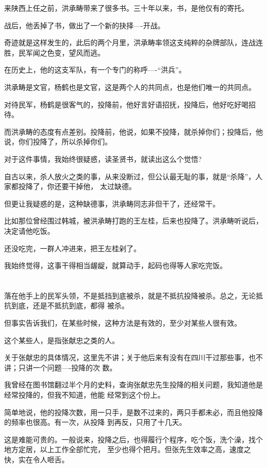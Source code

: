 \documentclass[11pt,a4paper,onecolumn]{article}
\begin{document}
来陕西上任之前，洪承畴带来了很多书。三十年以来，书，是他仅有的寄托。

战后，他丢掉了书，做出了一个新的抉择----开战。

奇迹就是这样发生的，此后的两个月里，洪承畴率领这支纯粹的杂牌部队，连战连胜，民军闻之色变，望风而逃。

在历史上，他的这支军队，有一个专门的称呼----``洪兵''。

洪承畴是文官，杨鹤也是文官，这是两个人的共同点，也是他们唯一的共同点。

对待民军，杨鹤是很客气的，投降前，他好言好语招抚，投降后，他好吃好喝招待。

而洪承畴的态度有点差别。投降前，他说，如果不投降，就杀掉你们；投降后，他说，你们投降了，所以杀掉你们。

对于这件事情，我始终很疑惑，读圣贤书，就读出这么个觉悟?

自古以来，杀人放火之类的事，从来没断过，但公认最无耻的事，就是``杀降''，人家都投降了，你还要干掉他，
太过缺德。

但更让我疑惑的是，这种缺德事，洪承畴同志非但干了，还经常干。

比如那位曾经围过韩城，被洪承畴打跑的王左桂，后来也投降了。洪承畴听说后，决定请他吃饭。

还没吃完，一群人冲进来，把王左桂剁了。

我始终觉得，这事干得相当龌龊，就算动手，起码也得等人家吃完饭。

\section[\thesection]{}

落在他手上的民军头领，不是抵挡到底被杀，就是不抵抗投降被杀。总之，无论抵抗到底，还是不抵抗到底，都得
被杀。

但事实告诉我们，在某些时候，这种方法是有效的，至少对某些人很有效。

这个某些人，是指张献忠之类的人。

关于张献忠的具体情况，这里先不讲；关于他后来有没有在四川干过那些事，也不讲；只讲一个问题----投降的次
数。

我曾经在图书馆翻过半个月的史料，查询张献忠先生投降的相关问题，我知道他是经常投降的，但我不知道，他能
经常到这个份上。

简单地说，他的投降次数，用一只手，是数不过来的，两只手都未必，而且他投降的频率也很高。有一次，从投降
到再反，只用了十几天。

这是难能可贵的。一般说来，投降之后，也得履行个程序，吃个饭，洗个澡，找个地方定居，以上工作全部忙完，
至少也得个把月。但张先生效率之高，速度之快，实在令人咂舌。
\end{document}
